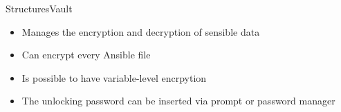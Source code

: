\documentclass[10pt]{beamer}
\begin{document}
\begin{frame}[fragile]{Structures}{Vault}
\begin{itemize}
    \item Manages the encryption and decryption of sensible data
    \item Can encrypt every Ansible file
    \item Is possible to have variable-level encrpytion
    \item The unlocking password can be inserted via prompt or password manager
\end{itemize}
\end{frame}
\end{document}
